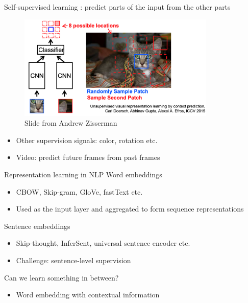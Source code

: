 \documentclass[usenames,dvipsnames,notes]{beamer}
\begin{document}
\begin{frame}
    {Self-supervised learning}
    : predict parts of the input from the other parts
    \vspace{-2em}
    \begin{figure}
        \includegraphics[height=5cm]{figures/image-self}
        \caption{Slide from Andrew Zisserman}
    \end{figure}
    \vspace{-2em}
    \begin{itemize}
        \item Other supervision signals: color, rotation etc.
        \item Video: predict future frames from past frames
    \end{itemize}
\end{frame}

\begin{frame}
    {Representation learning in NLP}
    Word embeddings\\
    \begin{itemize}
        \item CBOW, Skip-gram, GloVe, fastText etc.
        \item Used as the input layer and aggregated to form sequence representations
    \end{itemize}

    Sentence embeddings\\
    \begin{itemize}
        \item Skip-thought, InferSent, universal sentence encoder etc.
        \item Challenge: sentence-level supervision
    \end{itemize}

    Can we learn something in between?\\
    \begin{itemize}
        \item[] Word embedding with contextual information
    \end{itemize}
\end{frame}
\end{document}
